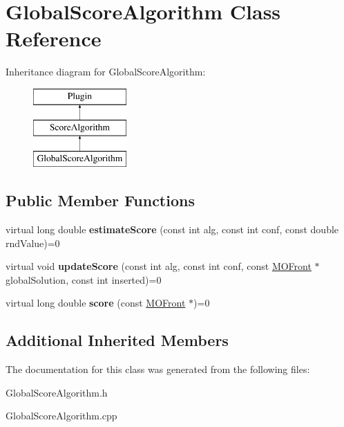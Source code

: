 \hypertarget{classGlobalScoreAlgorithm}{}\section{Global\+Score\+Algorithm Class Reference}
\label{classGlobalScoreAlgorithm}
Inheritance diagram for Global\+Score\+Algorithm\+:\begin{figure}[H]
\begin{center}
\leavevmode
\includegraphics[height=3.000000cm]{d4/dfe/classGlobalScoreAlgorithm}
\end{center}
\end{figure}
\subsection*{Public Member Functions}
\begin{DoxyCompactItemize}
\item 
\mbox{\label{classGlobalScoreAlgorithm_a7bb80f3b59672efe3e5b42682c905d8f}} 
virtual long double {\bfseries estimate\+Score} (const int alg, const int conf, const double rnd\+Value)=0
\item 
\mbox{\label{classGlobalScoreAlgorithm_a9d746fc68d65fcb9d645d0f8f0a31531}} 
virtual void {\bfseries update\+Score} (const int alg, const int conf, const \mbox{\hyperlink{classMOFront}{M\+O\+Front}} $\ast$global\+Solution, const int inserted)=0
\item 
\mbox{\label{classGlobalScoreAlgorithm_aa97507d258132308eb0a1b9863ee13c5}} 
virtual long double {\bfseries score} (const \mbox{\hyperlink{classMOFront}{M\+O\+Front}} $\ast$)=0
\end{DoxyCompactItemize}
\subsection*{Additional Inherited Members}


The documentation for this class was generated from the following files\+:\begin{DoxyCompactItemize}
\item 
Global\+Score\+Algorithm.\+h\item 
Global\+Score\+Algorithm.\+cpp\end{DoxyCompactItemize}
